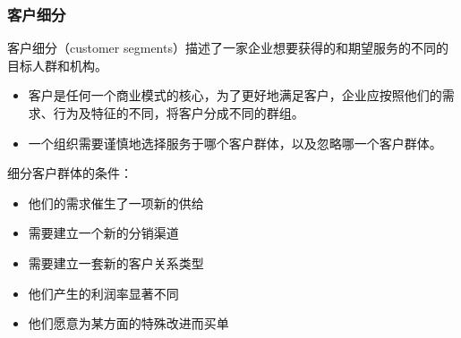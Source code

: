 	\subsubsection{客户细分}
	客户细分（customer segments）描述了一家企业想要获得的和期望服务的不同的目标人群和机构。
	\begin{itemize}
		\item 客户是任何一个商业模式的核心，为了更好地满足客户，企业应按照他们的需求、行为及特征的不同，将客户分成不同的群组。
		\item 一个组织需要谨慎地选择服务于哪个客户群体，以及忽略哪一个客户群体。
	\end{itemize}

	细分客户群体的条件：
	\begin{itemize}
		\item 他们的需求催生了一项新的供给
		\item 需要建立一个新的分销渠道
		\item 需要建立一套新的客户关系类型
		\item 他们产生的利润率显著不同
		\item 他们愿意为某方面的特殊改进而买单
	\end{itemize}


